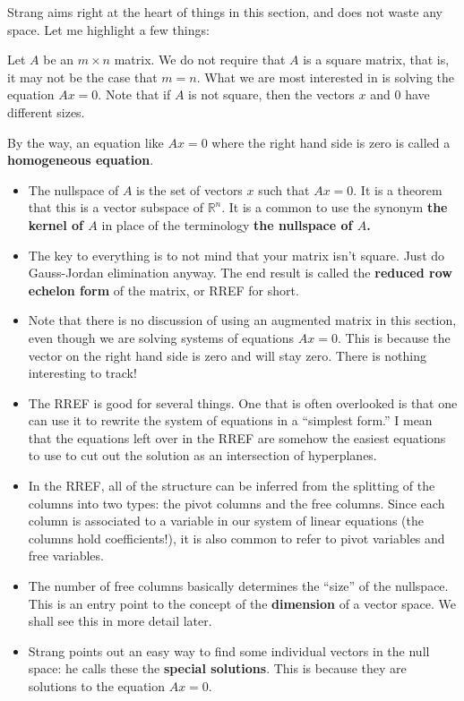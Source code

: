 \documentclass[10pt,]{book}
\newcommand{\terminology}[1]{\textbf{#1}}
\theoremstyle{plain}
\theoremstyle{definition}
\numberwithin{equation}{section}
\begin{document}
      Strang aims right at the heart of things in this section, and does not
      waste any space. Let me highlight a few things:
\par

      Let \(A\) be an \(m\times n\) matrix. We do not require that \(A\) is a square
      matrix, that is, it may not be the case that \(m=n\). What we are most
      interested in is solving the equation \(Ax = 0\). Note that if \(A\) is not
      square, then the vectors \(x\) and \(0\) have different sizes.
\par

      By the way, an equation like \(Ax=0\) where the right hand side is zero
      is called a \terminology{homogeneous equation}.
\begin{itemize}
\item{}The nullspace of \(A\) is the set of vectors \(x\) such that \(Ax=0\). It
        is a theorem that this is a vector subspace of \(\mathbb{R}^n\). It is a
        common to use the synonym \terminology{the kernel of \(A\)} in place of the
        terminology \terminology{the nullspace of \(A\).}
      \item{}The key to everything is to not mind that your matrix isn't square.
        Just do Gauss-Jordan elimination anyway. The end result is called the
        \terminology{reduced row echelon form} of the matrix, or RREF for short.
      \item{}Note that there is no discussion of using an augmented matrix in this
        section, even though we are solving systems of equations \(Ax=0\). This
        is because the vector on the right hand side is zero and will stay
        zero. There is nothing interesting to track!
      \item{}The RREF is good for several things. One that is often overlooked is
        that one can use it to rewrite the system of equations in a ``simplest
        form.'' I mean that the equations left over in the RREF are somehow
        the easiest equations to use to cut out the solution as an intersection
        of hyperplanes.
      \item{}In the RREF, all of the structure can be inferred from the splitting
        of the columns into two types: the pivot columns and the free columns.
        Since each column is associated to a variable in our system of linear
        equations (the columns hold coefficients!), it is also common to refer
        to pivot variables and free variables.
      \item{}The number of free columns basically determines the ``size'' of the
        nullspace. This is an entry point to the concept of the
        \terminology{dimension} of a vector space. We shall see this in more detail
        later.
      \item{}Strang points out an easy way to find some individual vectors in the
        null space: he calls these the \terminology{special solutions}. This is
        because they are solutions to the equation \(Ax=0\).
      \end{itemize}
\typeout{************************************************}
\typeout{************************************************}
\end{document}
